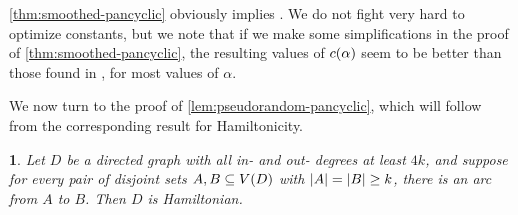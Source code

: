 \documentclass[11pt,english]{article}
\theoremstyle{plain}
\theoremstyle{definition}
\theoremstyle{definition}
\theoremstyle{plain}
\theoremstyle{plain}
\theoremstyle{plain}
\newtheorem{lem}[thm]{\protect\lemmaname}
\theoremstyle{plain}
\theoremstyle{remark}
\theoremstyle{remark}
\let\originalleft\left
\let\originalright\right
\renewcommand{\left}{\mathopen{}\mathclose\bgroup\originalleft}
\renewcommand{\right}{\aftergroup\egroup\originalright}
\providecommand{\lemmaname}{Lemma}
\begin{document}
\ref{thm:smoothed-pancyclic} obviously implies \cite[Theorems~1 and~3]{BFM03}.
We do not fight very hard to optimize constants, but we note that
if we make some simplifications in the proof of \ref{thm:smoothed-pancyclic},
the resulting values of $\cdi\left(\alpha\right)$ seem to be better
than those found in \cite{BFM03}, for most values of $\alpha$.

We now turn to the proof of \ref{lem:pseudorandom-pancyclic}, which
will follow from the corresponding result for Hamiltonicity.
\begin{lem}
\label{lem:pseudorandom-hamiltonian}Let $D$ be a directed graph
with all in- and out- degrees at least $4k$, and suppose for every pair of
disjoint sets $A,B\subseteq V\left(D\right)$ with $\left|A\right|=\left|B\right|\ge k$,
there is an arc from $A$ to $B$. Then $D$ is Hamiltonian.\end{lem}
\end{document}
